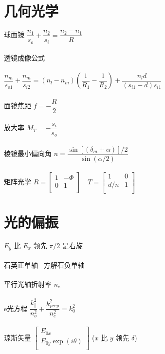 \documentclass{article}
\begin{document}
\begin{multicols}{2}
\section{几何光学}

球面镜 $\dfrac{n_1}{s_o} + \dfrac{n_2}{s_i} = \dfrac{n_2 - n_1}{R}  $
\\\\
透镜成像公式
\\\\
$\dfrac{n_m}{s_{o1}} + \dfrac{n_m}{s_{i2}} = \left( n_l - n_m \right) \left( \dfrac{1}{R_1} - \dfrac{1}{R_2}   \right) + \dfrac{n_l d}{\left( s_{i1} - d \right)s_{i1}}   $
\\\\
面镜焦距 $f = - \dfrac{R}{2} $
\\\\
放大率 $M_T = - \dfrac{s_i}{s_o} $
\\\\
棱镜最小偏向角 $n = \dfrac{\sin \left[ \left( \delta_m + \alpha \right) \right] / 2}{\sin \left( \alpha / 2 \right)} $
\\\\
矩阵光学 $R = \left[
  \begin{array}{ccc}
   1 & - \Phi \\
   0 & 1 \\
  \end{array}
\right ]
\quad T = \left[
  \begin{array}{ccc}
   1 & 0 \\
   d/n & 1 \\
  \end{array}
\right ]
$

\section{光的偏振}

$E_y$ 比 $E_x$ 领先 $\pi/2$ 是右旋
\\\\
石英正单轴 \ 方解石负单轴
\\\\
平行光轴折射率 $n_e$
\\\\
e光方程 $\dfrac{k_{\parallel}^2}{n_o^2} + \dfrac{k_{prep}^2}{n_e^2} = k_0^2  $
\\\\
琼斯矢量 $\left[
  \begin{array}{cc}
   E_{0x} \\
   E_{0y} \exp \left( i \theta \right)  \\
  \end{array}
\right ]
$ ($x$ 比 $y$ 领先 $\delta$)


\end{multicols}
\end{document}
